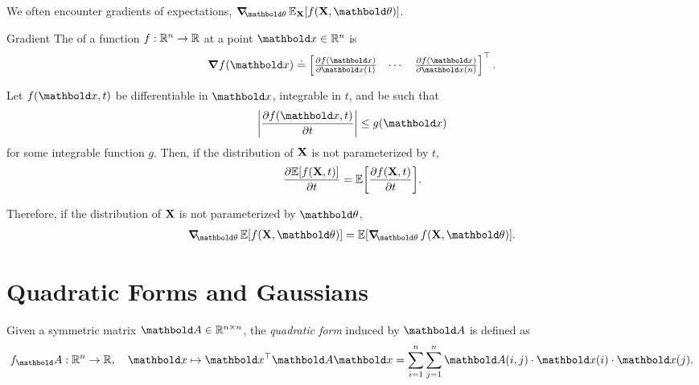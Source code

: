 We often encounter gradients of expectations, $\grad_\vtheta \E[\rX]{f(\rX,\vtheta)}$.

\begin{marginbox}{Gradient}
  The  of a function $f : \mathbb{R}^n \to \mathbb{R}$ at a point $\vx \in \R^n$ is \begin{align}
    \grad f(\vx) \defeq \transpose{\begin{bmatrix}
      \pdv{f(\vx)}{\vx(1)} & \cdots & \pdv{f(\vx)}{\vx(n)} \\
   \end{bmatrix}}.
  \end{align}
\end{marginbox}

\begin{fct}
  Let $f(\vx, t)$ be differentiable in $\vx$, integrable in $t$, and be such that \begin{align*}
    \abs{\pdv{f(\vx, t)}{t}} \leq g(\vx)
  \end{align*} for some integrable function $g$.
  Then, if the distribution of $\mathbf{X}$ is not parameterized by $t$, \begin{align}
    \pdv{\E{f(\rX, t)}}{t} = \E{\pdv{f(\rX, t)}{t}}.
  \end{align}
\end{fct}

Therefore, if the distribution of $\mathbf{X}$ is not parameterized by $\vtheta$, \begin{align}
  \grad_\vtheta \E{f(\rX,\vtheta)} = \E{\grad_\vtheta f(\rX,\vtheta)}. \label{eq:swap_grad_exp_order}
\end{align}

\section{Quadratic Forms and Gaussians}\label{sec:fundamentals:qf}

\begin{defn}
  Given a symmetric matrix $\mA \in \R^{n \times n}$, the \emph{quadratic form} induced by $\mA$ is defined as \begin{align}
    f_\mA : \R^n \to \R, \quad \vx \mapsto \transpose{\vx} \mA \vx = \sum_{i=1}^n \sum_{j=1}^n \mA(i,j) \cdot \vx(i) \cdot \vx(j). \label{eq:quadratic_form}
  \end{align}
\end{defn}

